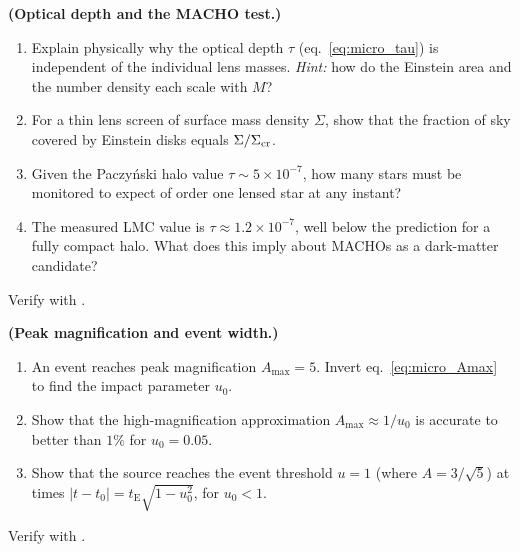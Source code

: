 \begin{exercise}
\label{ex:micro_optical_depth}
\textbf{(Optical depth and the MACHO test.)}
\begin{enumerate}[label=(\alph*)]
    \item Explain physically why the optical depth $\tau$
          (eq.~\ref{eq:micro_tau}) is independent of the individual lens
          masses.  \textit{Hint:} how do the Einstein area and the number
          density each scale with $M$?
    \item For a thin lens screen of surface mass density $\Sigma$, show that
          the fraction of sky covered by Einstein disks equals
          $\Sigma/\Sigma_{\mathrm{cr}}$.
    \item Given the Paczy\'nski halo value $\tau \sim 5\times10^{-7}$,
          how many stars must be monitored to expect of order one lensed star
          at any instant?
    \item The measured LMC value is $\tau \approx 1.2\times10^{-7}$, well
          below the prediction for a fully compact halo.  What does this imply
          about MACHOs as a dark-matter candidate?
\end{enumerate}
Verify with
.
\end{exercise}

\begin{exercise}
\label{ex:micro_peak}
\textbf{(Peak magnification and event width.)}
\begin{enumerate}[label=(\alph*)]
    \item An event reaches peak magnification $A_{\max} = 5$.  Invert
          eq.~\eqref{eq:micro_Amax} to find the impact parameter $u_0$.
    \item Show that the high-magnification approximation
          $A_{\max}\approx1/u_0$ is accurate to better than $1\%$ for
          $u_0 = 0.05$.
    \item Show that the source reaches the event threshold $u = 1$ (where
          $A = 3/\sqrt5$) at times $|t - t_0| = t_{\mathrm{E}}\sqrt{1-u_0^2}$,
          for $u_0 < 1$.
\end{enumerate}
Verify with
.
\end{exercise}

